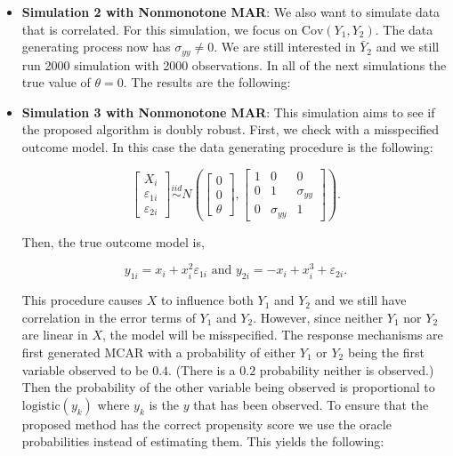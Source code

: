\documentclass[12pt]{article}
\newcommand{\Cov}{{\text{Cov}}}
\newcommand{\logistic}{{\text{logistic}}}
\begin{document}
\begin{itemize}
    
    
    

    \newpage
    
    \item \textbf{Simulation 2 with Nonmonotone MAR}:
    We also want to simulate data that is correlated. For this simulation, we
    focus on $\Cov(Y_1, Y_2)$. The data generating process now has $\sigma_{yy}
    \neq 0$. We are still interested in $\bar Y_2$ and we still run 2000
    simulation with 2000 observations. In all of the next simulations the true
    value of $\theta = 0$. The results are the following:

    
    
    

    \newpage

  \item \textbf{Simulation 3 with Nonmonotone MAR}:
    This simulation aims to see if the proposed algorithm is doubly robust.
    First, we check with a misspecified outcome model. In this case the data
    generating procedure is the following:

    \[\begin{bmatrix}
    X_i \\ \varepsilon_{1i} \\ \varepsilon_{2i}
    \end{bmatrix} \stackrel{iid}{\sim}
    N\left(
    \begin{bmatrix}
        0 \\ 0 \\ \theta
    \end{bmatrix},
    \begin{bmatrix}
        1 & 0 & 0 \\
        0 & 1 & \sigma_{yy}\\
        0 & \sigma_{yy} & 1
    \end{bmatrix}
    \right).\]

    Then, the true outcome model is,

    \[y_{1i} = x_i + x_i^2 \varepsilon_{1i} \text{ and } 
    y_{2i} = -x_i + x_i^3 + \varepsilon_{2i}.\]

    This procedure causes $X$ to influence both $Y_1$ and $Y_2$ and we still
    have correlation in the error terms of $Y_1$ and $Y_2$. However, since
    neither $Y_1$ nor $Y_2$ are linear in $X$, the model will be misspecified.
    The response mechanisms are first generated MCAR with a probability of
    either $Y_1$ or $Y_2$ being the first variable observed to be $0.4$. (There
    is a $0.2$ probability neither is observed.) Then the probability of the
    other variable being observed is proportional to $\logistic(y_k)$ where
    $y_k$ is the $y$ that has been observed. To ensure that the proposed method
    has the correct propensity score we use the oracle probabilities instead of
    estimating them. This yields the following:


\end{itemize}
\end{document}

